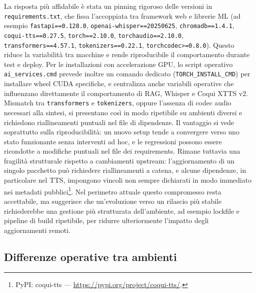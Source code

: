 La risposta più affidabile è stata un pinning rigoroso delle versioni in \texttt{requirements.txt}, che fissa l'accoppiata tra framework web e librerie ML (ad esempio \texttt{fastapi==0.128.0}, \texttt{openai-whisper==20250625}, \texttt{chromadb==1.4.1}, \texttt{coqui-tts==0.27.5}, \texttt{torch==2.10.0}, \texttt{torchaudio==2.10.0}, \texttt{transformers==4.57.1}, \texttt{tokenizers==0.22.1}, \texttt{torchcodec>=0.8.0}). Questo riduce la variabilità tra macchine e rende riproducibile il comportamento durante test e deploy. Per le installazioni con accelerazione GPU, lo script operativo \texttt{ai_services.cmd} prevede inoltre un comando dedicato (\texttt{TORCH_INSTALL_CMD}) per installare wheel CUDA specifiche, e centralizza anche variabili operative che influenzano direttamente il comportamento di RAG, Whisper e Coqui XTTS v2. Mismatch tra \texttt{transformers} e \texttt{tokenizers}, oppure l'assenza di codec audio necessari alla sintesi, si presentano così in modo ripetibile su ambienti diversi e richiedono riallineamenti puntuali nel file di dipendenze. Il vantaggio si vede soprattutto sulla riproducibilità: un nuovo setup tende a convergere verso uno stato funzionante senza interventi ad hoc, e le regressioni possono essere ricondotte a modifiche puntuali nel file dei requirements. Rimane tuttavia una fragilità strutturale rispetto a cambiamenti upstream: l'aggiornamento di un singolo pacchetto può richiedere riallineamenti a catena, e alcune dipendenze, in particolare nel TTS, impongono vincoli non sempre dichiarati in modo immediato nei metadati pubblici\footnote{PyPI: coqui-tts --- \url{https://pypi.org/project/coqui-tts/}.}. Nel perimetro attuale questo compromesso resta accettabile, ma suggerisce che un'evoluzione verso un rilascio più stabile richiederebbe una gestione più strutturata dell'ambiente, ad esempio lockfile e pipeline di build ripetibile, per ridurre ulteriormente l'impatto degli aggiornamenti remoti.

\subsection{Differenze operative tra ambienti}\label{subsec:differenze-windows-ubuntu}

